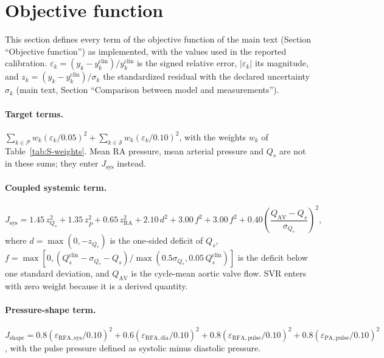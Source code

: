 \documentclass{article}
\begin{document}
\section{Objective function}
\label{sec:S-weights}
This section defines every term of the objective function of the main text (Section ``Objective function'') as implemented, with the values used in the reported calibration. $\varepsilon_k = (y_k - y_k^{\mathrm{clin}})/y_k^{\mathrm{clin}}$ is the signed relative error, $\lvert\varepsilon_k\rvert$ its magnitude, and $z_k = (y_k - y_k^{\mathrm{clin}})/\sigma_k$ the standardized residual with the declared uncertainty $\sigma_k$ (main text, Section ``Comparison between model and measurements'').

\paragraph{Target terms.} $\sum_{k\in\mathcal{P}} w_k(\varepsilon_k/0.05)^2 + \sum_{k\in\mathcal{S}} w_k(\varepsilon_k/0.10)^2$, with the weights $w_k$ of Table~\ref{tab:S-weights}. Mean RA pressure, mean arterial pressure and $Q_s$ are not in these sums; they enter $J_{\mathrm{sys}}$ instead.

\paragraph{Coupled systemic term.}
\begin{equation*}
J_{\mathrm{sys}} = 1.45\,z_{Q_s}^2 + 1.35\,z_{\overline{P}}^2 + 0.65\,z_{\mathrm{RA}}^2
+ 2.10\,d^2 + 3.00\,f^2 + 3.00\,f^2 + 0.40\left(\frac{Q_{\mathrm{AV}} - Q_s}{\sigma_{Q_s}}\right)^2,
\end{equation*}
where $d = \max(0, -z_{Q_s})$ is the one-sided deficit of $Q_s$, $f = \max[0, (Q_s^{\mathrm{clin}} - \sigma_{Q_s} - Q_s)/\max(0.5\sigma_{Q_s}, 0.05\,Q_s^{\mathrm{clin}})]$ is the deficit below one standard deviation, and $Q_{\mathrm{AV}}$ is the cycle-mean aortic valve flow. SVR enters with zero weight because it is a derived quantity.

\paragraph{Pressure-shape term.} $J_{\mathrm{shape}} = 0.8(\varepsilon_{\mathrm{RFA,sys}}/0.10)^2 + 0.6(\varepsilon_{\mathrm{RFA,dia}}/0.10)^2 + 0.8(\varepsilon_{\mathrm{RFA,pulse}}/0.10)^2 + 0.8(\varepsilon_{\mathrm{PA,pulse}}/0.10)^2$, with the pulse pressure defined as systolic minus diastolic pressure.
\end{document}
